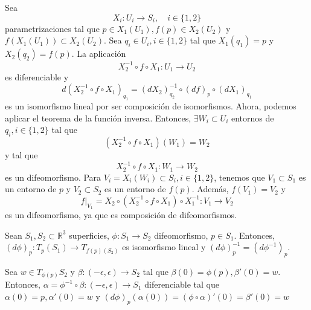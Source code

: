 \begin{dem}
  Sea
  \[
    X_{i}: U_{i} \to S_{i}, \quad i \in \{ 1, 2 \}
  \]
  parametrizaciones tal que $p \in X_{1}(U_{1}), f(p) \in X_{2}(U_{2})$ y $f(X_{1}(U_{1})) \subset X_{2}(U_{2})$. Sea $q_{i} \in U_{i}, i \in \{ 1, 2 \}$ tal que $X_{1}(q_{1}) = p$ y $X_{2}(q_{2}) = f(p)$. La aplicación
  \[
    X_{2}^{-1} \circ f \circ X_{1} : U_{1} \to U_{2}
  \]
  es diferenciable y
  \[
    d(X_{2}^{-1} \circ f \circ X_{1})_{q_{1}} = (d X_{2})_{q_{2}}^{-1} \circ (d f)_{p} \circ (d X_{1})_{q_{1}}
  \]
  es un isomorfismo lineal por ser composición de isomorfismos. Ahora, podemos aplicar el teorema de la función inversa. Entonces, $\exists W_{i} \subset U_{i}$ entornos de $q_{i}, i \in \{ 1, 2 \}$ tal que
  \[
    (X_{2}^{-1} \circ f \circ X_{1})(W_{1}) = W_{2}
  \]
  y tal que
  \[ 
    X_{2}^{-1} \circ f \circ X_{1} : W_{1} \to W_{2} 
  \] 
  es un difeomorfismo. Para $V_{i} = X_{i}(W_{i}) \subset S_{i}, i \in \{ 1, 2 \}$, tenemos que $V_{1} \subset S_{1}$ es un entorno de $p$ y $V_{2}\subset S_{2}$ es un entorno de $f(p)$. Además, $f(V_{1}) = V_{2}$ y
  \[
    f|_{V_{1}} = X_{2} \circ (X_{2}^{-1} \circ f \circ X_{1}) \circ X_{1}^{-1} : V_{1} \to V_{2}
  \]
  es un difeomorfismo, ya que es composición de difeomorfismos.
\end{dem}

\begin{prop}
  Sean $S_{1}, S_{2} \subset \mathbb{R}^{3}$ superficies, $\phi : S_{1} \to S_{2}$ difeomorfismo, $ p \in S_{1}$. Entonces, $(d \phi)_{p} : T_{p}(S_{1}) \to T_{f(p)(S_{2})}$ es isomorfismo lineal y $(d \phi)_{p}^{-1} = (d \phi ^{-1})_{p}$.
\end{prop}

\begin{dem}
  Sea $w \in T_{\phi(p)}S_{2}$ y $\beta : (-\epsilon, \epsilon) \to S_{2}$ tal que $\beta(0) = \phi(p), \beta'(0) = w$. Entonces, $\alpha = \phi^{-1} \circ \beta : (-\epsilon, \epsilon) \to S_{1}$ diferenciable tal que $\alpha(0) = p, \alpha'(0) = w$ y $(d \phi)_{p}(\alpha(0)) = (\phi \circ \alpha)'(0) = \beta'(0) = w$
\end{dem}

%
